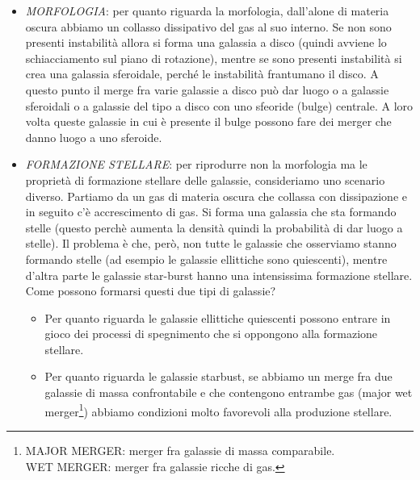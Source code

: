\begin{itemize}
    \item \emph{MORFOLOGIA}: per quanto riguarda la morfologia, dall'alone di materia oscura abbiamo un collasso dissipativo del gas al suo interno. Se non sono presenti instabilità allora si forma una galassia a disco (quindi avviene lo schiacciamento sul piano di rotazione), mentre se sono presenti instabilità si crea una galassia sferoidale, perché le instabilità frantumano il disco. A questo punto il merge fra varie galassie a disco può dar luogo o a galassie sferoidali o a galassie del tipo a disco con uno sfeoride (bulge) centrale. A loro volta queste galassie in cui è presente il bulge possono fare dei merger che danno luogo a uno sferoide.
    \item \emph{FORMAZIONE STELLARE}: per riprodurre non la morfologia ma le proprietà di formazione stellare delle galassie, consideriamo uno scenario diverso. Partiamo da un gas di materia oscura che collassa con dissipazione e in seguito c’è accrescimento di gas. Si forma una galassia che sta formando stelle (questo perchè aumenta la densità quindi la probabilità di dar luogo a stelle). Il problema è che, però, non tutte le galassie che osserviamo stanno formando stelle (ad esempio le galassie ellittiche sono quiescenti), mentre d’altra parte le galassie star-burst hanno una intensissima formazione stellare. Come possono formarsi questi due tipi di galassie?
    \begin{itemize}
        \item Per quanto riguarda le galassie ellittiche quiescenti possono entrare in gioco dei processi di spegnimento che si oppongono alla formazione stellare.
        \item Per quanto riguarda le galassie starbust, se abbiamo un merge fra due galassie di massa confrontabile e che contengono entrambe gas (major wet merger\footnote{
        MAJOR MERGER: merger fra galassie di massa comparabile. \\
        WET MERGER: merger fra galassie ricche di gas.
        }) abbiamo condizioni molto favorevoli alla produzione stellare.
    \end{itemize}
\end{itemize}